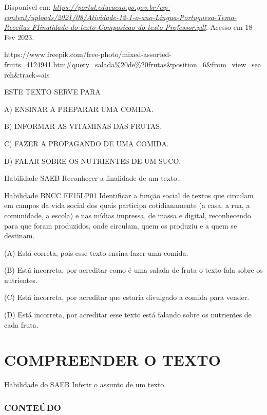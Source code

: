 \begin{escola}
Disponível em:
\href{https://portal.educacao.go.gov.br/wp-content/uploads/2021/08/Atividade-12-1-o-ano-Lingua-Portuguesa-Tema-Receitas-FIinalidade-do-texto-Composicao-do-texto-Professor.pdf}{\emph{https://portal.educacao.go.gov.br/wp-content/uploads/2021/08/Atividade-12-1-o-ano-Lingua-Portuguesa-Tema-Receitas-FIinalidade-do-texto-Composicao-do-texto-Professor.pdf}}.
Acesso em 18 Fev 2023.

https://www.freepik.com/free-photo/mixed-assorted-fruits\_4124941.htm\#query=salada\%20de\%20frutas\&position=6\&from\_view=search\&track=ais

ESTE TEXTO SERVE PARA

A) ENSINAR A PREPARAR UMA COMIDA.

B) INFORMAR AS VITAMINAS DAS FRUTAS.

C) FAZER A PROPAGANDO DE UMA COMIDA.

D) FALAR SOBRE OS NUTRIENTES DE UM SUCO.

Habilidade SAEB Reconhecer a finalidade de um texto..

Habilidade BNCC EF15LP01 Identificar a função social de textos que
circulam em campos da vida social dos quais participa cotidianamente (a
casa, a rua, a comunidade, a escola) e nas mídias impressa, de massa e
digital, reconhecendo para que foram produzidos, onde circulam, quem os
produziu e a quem se destinam.

\protect\hypertarget{_heading=h.2xcytpi}{}{}(A) Está correta, pois esse
texto ensina fazer uma comida.

(B) Está incorreta, por acreditar como é uma salada de fruta o texto
fala sobre os nutrientes.

(C) Está incorreta, por acreditar que estaria divulgado a comida para
vender.

(D) Está incorreta, por acreditar esse texto está falando sobre os
nutrientes de cada fruta.

\chapter{COMPREENDER O TEXTO}

\protect\hypertarget{_heading=h.3whwml4}{}{}Habilidade do SAEB
Inferir o assunto de um texto.

\subsection{CONTEÚDO}\label{conteuxfado-4}


\end{escola}
